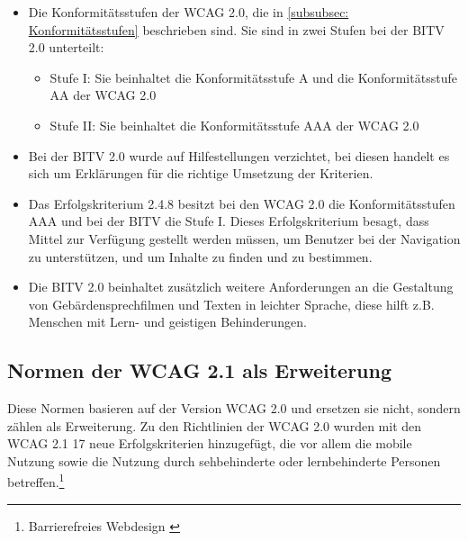 \begin{itemize}
	\item Die Konformitätsstufen der \ac{WCAG} 2.0, die in \cref{subsubsec: Konformitätsstufen} beschrieben sind. Sie sind in zwei Stufen bei 
	der \ac{BITV} 2.0 unterteilt:
		\begin{itemize}
			\item Stufe I: Sie beinhaltet die Konformitätsstufe A und die Konformitätsstufe AA der \ac{WCAG} 2.0
			\item Stufe II: Sie beinhaltet die Konformitätsstufe AAA der \ac{WCAG} 2.0
		\end{itemize}
	
	\item Bei der \ac{BITV} 2.0 wurde auf Hilfestellungen verzichtet, bei diesen handelt es sich um Erklärungen für die richtige Umsetzung der Kriterien.
	
	\item Das Erfolgskriterium 2.4.8 besitzt bei den \ac{WCAG} 2.0 die Konformitätsstufen AAA und bei der \ac{BITV} die Stufe I. Dieses Erfolgskriterium besagt, dass 
	Mittel zur Verfügung gestellt werden müssen, um Benutzer bei der Navigation zu unterstützen, und um Inhalte zu finden und zu bestimmen.
	
	\item Die \ac{BITV} 2.0 beinhaltet zusätzlich weitere Anforderungen an die Gestaltung von Gebärdensprechfilmen und Texten in leichter Sprache, diese hilft
	z.B. Menschen mit Lern- und geistigen Behinderungen.
\end{itemize}

\subsection{Normen der \ac{WCAG} 2.1 als Erweiterung}
\label{subsec: Normen der WCAG 2.1}

Diese Normen basieren auf der Version \ac{WCAG} 2.0 und ersetzen sie nicht, sondern zählen als Erweiterung. Zu den Richtlinien der \ac{WCAG} 2.0 wurden mit den \ac{WCAG} 2.1 17 neue Erfolgskriterien hinzugefügt, die vor allem die mobile Nutzung sowie die Nutzung durch sehbehinderte oder lernbehinderte Personen betreffen.\footnote{Barrierefreies Webdesign \cite{BarrierefreiesWebdesign}}

